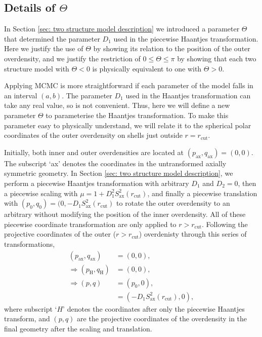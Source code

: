 \documentclass[a4paper,12pt]{report}
\begin{document}
\begin{appendices}
\chapter{Details of \texorpdfstring{$\Theta$}{the Haantjes rotation in the two structure model}} \label{appendix: Theta proofs}

In Section \ref{sec: two structure model description} we introduced a parameter $\Theta$ that determined the parameter $D_1$ used in the piecewise Haantjes transformation. Here we justify the use of $\Theta$ by showing its relation to the position of the outer overdensity, and we justify the restriction of $0 \leq \Theta \leq \pi$ by showing that each two structure model with $\Theta < 0$ is physically equivalent to one with $\Theta > 0$.

Applying MCMC is more straightforward if each parameter of the model falls in an interval $(a,b)$. The parameter $D_1$ used in the Haantjes transformation can take any real value, so is not convenient. Thus, here we will define a new parameter $\Theta$ to parameterise the Haantjes transformation. To make this parameter easy to physically understand, we will relate it to the spherical polar coordinates of the outer overdensity on shells just outside $r=r_\text{cut}$.

Initially, both inner and outer overdensities are located at $(p_\text{ax}, q_\text{ax}) = (0,0)$. The subscript `ax' denotes the coordinates in the untransformed axially symmetric geometry. In Section \ref{sec: two structure model description}, we perform a piecewise Haantjes transformation with arbitrary $D_1$ and $D_2=0$, then a piecewise scaling with $\mu=1+D_1^2 S_\text{ax}^2(r_\text{cut})$, and finally a piecewise translation with $(p_0, q_0)=(0,-D_1 S_\text{ax}^2(r_\text{cut})$ to rotate the outer overdensity to an arbitrary without modifying the position of the inner overdensity. All of these piecewise coordinate transformation are only applied to $r>r_\text{cut}$. Following the projective coordinates of the outer ($r > r_\text{cut}$) overdenisty through this series of transformations,
\begin{align}
    (p_\text{ax}, q_\text{ax}) &= (0,0), \\
    \Longrightarrow (p_\text{H}, q_\text{H}) &= (0,0), \\
    \Longrightarrow (p, q) &= (p_0, 0), \\
    &= (-D_1 S_\text{ax}^2 (r_\text{cut}), 0),
\end{align}
where subscript `$H$' denotes the coordinates after only the piecewise Haantjes transform, and $(p, q)$ are the projective coordinates of the overdensity in the final geometry after the scaling and translation.


\end{appendices}
\end{document}
